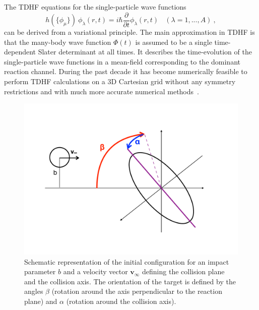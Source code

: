 The TDHF equations for the single-particle wave functions
\begin{equation}
h(\{\phi_{\mu}\}) \ \phi_{\lambda} (r,t) = i \hbar \frac{\partial}{\partial t} \phi_{\lambda} (r,t)
\ \ \ \ (\lambda = 1,...,A) \ ,
\end{equation}
can be derived from a variational principle. The main approximation in TDHF is
that the many-body wave function $\Phi(t)$  is assumed to be a single time-dependent
Slater determinant at all times. It describes the time-evolution of the single-particle
wave functions in a mean-field corresponding to the dominant reaction channel.
During the past decade it has become numerically feasible to perform TDHF calculations on a
3D Cartesian grid without any symmetry restrictions
and with much more accurate numerical methods~\citep{bottcher1989,umar2006c,sekizawa2013,maruhn2014}.
\begin{figure}
	\centerline{\includegraphics*[width=\textwidth]{../Figures/CaBk/geometry.pdf}}
	\caption{Schematic representation of the initial configuration for an impact parameter $b$ and  a velocity vector $\mathbf{v}_\infty$ defining the collision plane and the collision axis. The orientation of the target is defined by the angles $\beta$ (rotation around the axis perpendicular to the reaction plane) and $\alpha$ (rotation around the collision axis).}
	\label{fig:geometry}
\end{figure}

